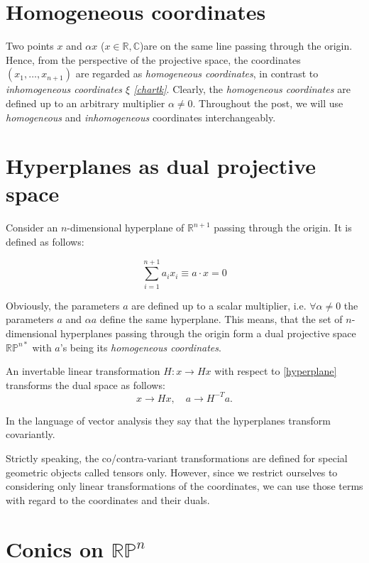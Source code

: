 \documentclass[a4paper,10pt]{article}
\begin{document}
\section{Homogeneous coordinates}

Two points $x$ and $\alpha x$  ($x \in \mathbb{R},\mathbb{C}$)are on the same line passing through the origin. Hence, from the perspective of the projective space, the coordinates $(x_1, \ldots, x_{n+1})$ are regarded as {\it homogeneous coordinates}, in contrast to {\it inhomogeneous coordinates $\xi$ \eqref{chartk}}. Clearly, the {\it homogeneous coordinates} are defined up to an arbitrary multiplier $\alpha \neq 0$. Throughout the post, we will use {\it homogeneous}  and {\it inhomogeneous} coordinates interchangeably.

\section{Hyperplanes as dual projective space}

Consider an $n$-dimensional hyperplane of $\mathbb{R}^{n+1}$ passing through the origin. It is defined as follows:

\begin{equation}
 \sum\limits_{i=1}^{n+1} a_i x_i \equiv a\cdot x = 0\label{hyperplane}
\end{equation}

Obviously, the parameters $a$ are defined up to a scalar multiplier, i.e. $\forall\alpha\neq 0$ the parameters $a$ and $\alpha a$ define the same hyperplane. This means, that the set of $n$-dimensional hyperplanes passing through the origin form a dual projective space $\mathbb{RP}^{n*}$ with $a$'s being its {\it homogeneous coordinates}. 

An invertable linear transformation $H: x \to H x$ with respect to \eqref{hyperplane} transforms the dual space as follows:
\begin{equation}
 x\to Hx, \quad a\to H^{-T} a.
\end{equation}

In the language of vector analysis they say that the hyperplanes transform covariantly.

{\tiny Strictly speaking, the co/contra-variant transformations are defined for special geometric objects called tensors only. However, since we restrict ourselves to considering only linear transformations of the coordinates, we can use those terms with regard to the coordinates and their duals. }

\section{Conics on $\mathbb{RP}^n$}
\end{document}
